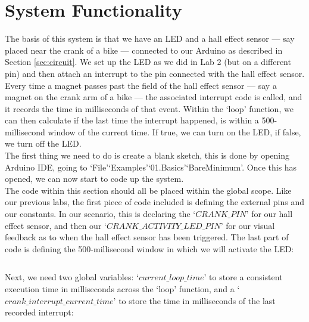 \documentclass[11pt,a4paper]{article}
\begin{document}
\section{System Functionality}
\label{sec:functionality}
The basis of this system is that we have an LED and a hall effect sensor --- say placed near the crank of a bike --- connected to our Arduino as described in Section \ref{sec:circuit}. We set up the LED as we did in Lab 2 (but on a different pin) and then attach an interrupt to the pin connected with the hall effect sensor. Every time a magnet passes past the field of the hall effect sensor --- say a magnet on the crank arm of a bike --- the associated interrupt code is called, and it records the time in milliseconds of that event. Within the `loop' function, we can then calculate if the last time the interrupt happened, is  within a 500-millisecond window of the current time. If true, we can turn on the LED, if false, we turn off the LED.\\

\noindent
The first thing we need to do is create a blank sketch, this is done by opening Arduino IDE, going to `File'\textrightarrow `Examples'\textrightarrow `01.Basics'\textrightarrow `BareMinimum'. Once this has opened, we can now start to code up the system.\\

\noindent
The code within this section should all be placed within the global scope. Like our previous labs, the first piece of code included is defining the external pins and our constants. In our scenario, this is declaring the `$CRANK\_PIN $' for our hall effect sensor, and then our `$CRANK\_ACTIVITY\_LED\_PIN$' for our visual feedback as to when the hall effect sensor has been triggered. The last part of code is defining the 500-millisecond window in which we will activate the LED:\\
\vspace{-1.75em}
\inputminted{arduino}{./src/1-define.txt}
\vspace{.75em}

\noindent
Next, we need two global variables: `$current\_loop\_time$' to store a consistent execution time in milliseconds across the `loop' function, and a `$crank\_interrupt\_current\_time$' to store the time in milliseconds of the last recorded interrupt:\\
\vspace{-1.75em}
\inputminted{arduino}{./src/2-system-variables.txt}
\vspace{.75em}
\end{document}
